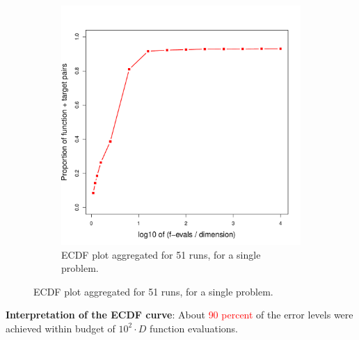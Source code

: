 \documentclass[hyperref={pdfpagelabels=false}]{beamer}
\begin{document}
\begin{frame}
\begin{figure}
\begin{subfigure}{0.46\textwidth}
\includegraphics[width = \textwidth]{DESEcdf.pdf}
\caption{ECDF plot aggregated for 51 runs, for a single problem.}
\label{fig:right}
\end{subfigure}
\label{fig:combined}
\end{figure}
\vspace{-3mm}
\textbf{Interpretation of the ECDF curve}: About \textcolor{red}{90 percent} of the error levels were achieved within budget of $10^2\cdot D$ function evaluations.

\end{frame}
\end{document}
